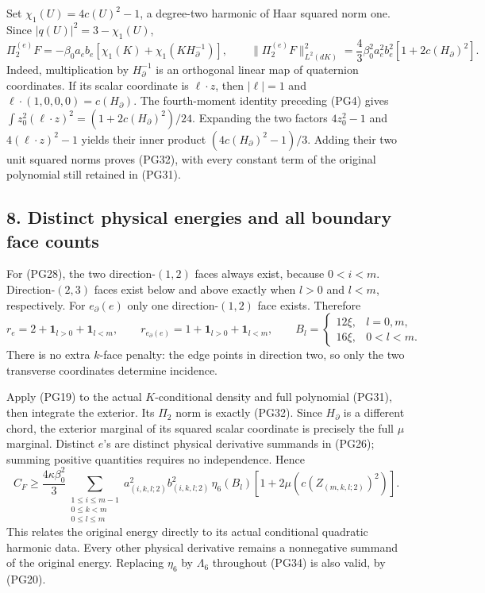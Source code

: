\documentclass[11pt]{article}
\begin{document}
Set \(\chi_1(U)=4c(U)^2-1\), a degree-two harmonic of Haar squared
norm one. Since \(|q(U)|^2=3-\chi_1(U)\),
\[
 \Pi_2^{(e)}F=-\beta_0a_eb_e
          [\chi_1(K)+\chi_1(KH_\partial^{-1})],\qquad
 \|\Pi_2^{(e)}F\|_{L^2(dK)}^2
 =\frac43\beta_0^2a_e^2b_e^2[1+2c(H_\partial)^2].
 \tag{PG32}
\]
Indeed, multiplication by \(H_\partial^{-1}\) is an orthogonal
linear map of quaternion coordinates. If its scalar coordinate is
\(\ell\cdot z\), then \(|\ell|=1\) and
\(\ell\cdot(1,0,0,0)=c(H_\partial)\).
The fourth-moment identity preceding (PG4) gives
\(\int z_0^2(\ell\cdot z)^2=(1+2c(H_\partial)^2)/24\).
Expanding the two factors \(4z_0^2-1\) and
\(4(\ell\cdot z)^2-1\) yields their inner product
\((4c(H_\partial)^2-1)/3\).
Adding their two unit squared norms proves (PG32), with every
constant term of the original polynomial still retained in (PG31).

\subsection*{8. Distinct physical energies and all boundary face counts}

For (PG28), the two direction-\((1,2)\) faces always exist, because
\(0<i<m\). Direction-\((2,3)\) faces exist below and above exactly
when \(l>0\) and \(l<m\), respectively. For \(e_\partial(e)\)
only one direction-\((1,2)\) face exists. Therefore
\[
 r_e=2+\mathbf1_{l>0}+\mathbf1_{l<m},\qquad
 r_{e_\partial(e)}=1+\mathbf1_{l>0}+\mathbf1_{l<m},\qquad
 B_l=\begin{cases}12\xi,&l=0,m,\\16\xi,&0<l<m.\end{cases}
 \tag{PG33}
\]
There is no extra \(k\)-face penalty: the edge points in direction
two, so only the two transverse coordinates determine incidence.

Apply (PG19) to the actual \(K\)-conditional density and full
polynomial (PG31), then integrate the exterior. Its \(\Pi_2\) norm
is exactly (PG32). Since \(H_\partial\) is a different chord, the
exterior marginal of its squared scalar coordinate is precisely
the full \(\mu\) marginal. Distinct \(e\)'s are distinct physical
derivative summands in (PG26); summing positive quantities requires
no independence. Hence
\[
 \boxed{\displaystyle
 C_F\ge\frac{4\kappa\beta_0^2}{3}
 \sum_{\substack{1\le i\le m-1\\0\le k<m\\0\le l\le m}}
 a_{(i,k,l;2)}^2b_{(i,k,l;2)}^2\,\eta_6(B_l)
     [1+2\mu(c(Z_{(m,k,l;2)})^2)].}
 \tag{PG34}
\]
This relates the original energy directly to its actual conditional
quadratic harmonic data. Every other physical derivative remains a
nonnegative summand of the original energy. Replacing \(\eta_6\)
by \(\Lambda_6\) throughout (PG34) is also valid, by (PG20).
\end{document}
